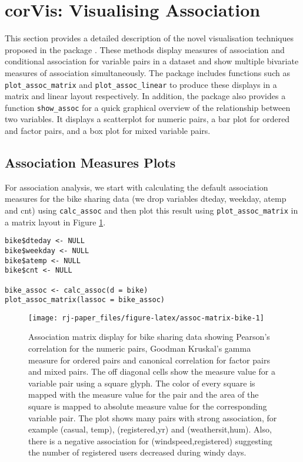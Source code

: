 \hypertarget{corvis-visualising-association}{%
\section{corVis: Visualising Association}\label{corvis-visualising-association}}

This section provides a detailed description of the novel visualisation techniques proposed in the package . These methods display measures of association and conditional association for variable pairs in a dataset and show multiple bivariate measures of association simultaneously. The package includes functions such as \texttt{plot\_assoc\_matrix} and \texttt{plot\_assoc\_linear} to produce these displays in a matrix and linear layout respectively. In addition, the package also provides a function \texttt{show\_assoc} for a quick graphical overview of the relationship between two variables. It displays a scatterplot for numeric pairs, a bar plot for ordered and factor pairs, and a box plot for mixed variable pairs.

\hypertarget{association-measures-plots}{%
\subsection{Association Measures Plots}\label{association-measures-plots}}

For association analysis, we start with calculating the default association measures for the bike sharing data (we drop variables dteday, weekday, atemp and cnt) using \texttt{calc\_assoc} and then plot this result using \texttt{plot\_assoc\_matrix} in a matrix layout in Figure \ref{fig:assoc-matrix-bike}.

\begin{verbatim}
bike$dteday <- NULL 
bike$weekday <- NULL
bike$atemp <- NULL
bike$cnt <- NULL

bike_assoc <- calc_assoc(d = bike)
plot_assoc_matrix(lassoc = bike_assoc)
\end{verbatim}

\begin{figure}

{\centering \texttt{[image: rj-paper\_files/figure-latex/assoc-matrix-bike-1]} 

}

\caption{Association matrix display for bike sharing data showing Pearson's correlation for the numeric pairs, Goodman Kruskal's gamma measure for ordered pairs and canonical correlation for factor pairs and mixed pairs. The off diagonal cells show the measure value for a variable pair using a square glyph. The color of every square is mapped with the measure value for the pair and the area of the square is mapped to absolute measure value for the corresponding variable pair. The plot shows many pairs with strong association, for example (casual, temp), (registered,yr) and (weathersit,hum). Also, there is a negative association for (windspeed,registered) suggesting the number of registered users decreased during windy days.}\label{fig:assoc-matrix-bike}
\end{figure}

